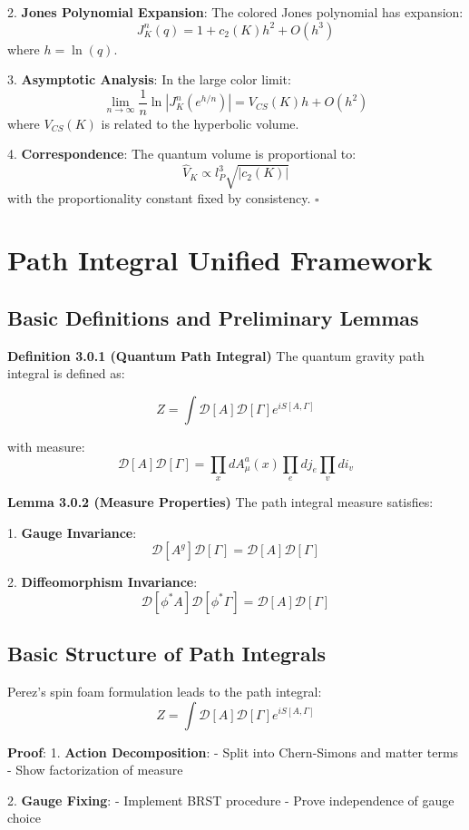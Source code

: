 \documentclass[12pt,a4paper]{article}
\begin{document}
2. \textbf{Jones Polynomial Expansion}:
   The colored Jones polynomial has expansion:
   \[
   J_K^n(q) = 1 + c_2(K)h^2 + O(h^3)
   \]
   where $h = \ln(q)$.

3. \textbf{Asymptotic Analysis}:
   In the large color limit:
   \[
   \lim_{n\to\infty} \frac{1}{n}\ln|J_K^n(e^{h/n})| = V_{CS}(K)h + O(h^2)
   \]
   where $V_{CS}(K)$ is related to the hyperbolic volume.

4. \textbf{Correspondence}:
   The quantum volume is proportional to:
   \[
   \hat{V}_K \propto l_P^3\sqrt{|c_2(K)|}
   \]
   with the proportionality constant fixed by consistency. $\square$

\section{Path Integral Unified Framework}
\subsection{Basic Definitions and Preliminary Lemmas}

\textbf{Definition 3.0.1 (Quantum Path Integral)}
The quantum gravity path integral is defined as:


\[
Z = \int \mathcal{D}[A]\mathcal{D}[\Gamma] e^{iS[A,\Gamma]}
\]

with measure:
\[
\mathcal{D}[A]\mathcal{D}[\Gamma] = \prod_x dA_\mu^a(x) \prod_e dj_e \prod_v di_v
\]

\textbf{Lemma 3.0.2 (Measure Properties)}
The path integral measure satisfies:

1. \textbf{Gauge Invariance}:
   \[
   \mathcal{D}[A^g]\mathcal{D}[\Gamma] = \mathcal{D}[A]\mathcal{D}[\Gamma]
   \]

2. \textbf{Diffeomorphism Invariance}:
   \[
   \mathcal{D}[\phi^*A]\mathcal{D}[\phi^*\Gamma] = \mathcal{D}[A]\mathcal{D}[\Gamma]
   \]

\subsection{Basic Structure of Path Integrals}
Perez's spin foam formulation\cite{perez2003spin} leads to the path integral:
\[
Z = \int \mathcal{D}[A]\mathcal{D}[\Gamma] e^{iS[A,\Gamma]}
\]

\textbf{Proof}:
1. \textbf{Action Decomposition}:
   - Split into Chern-Simons and matter terms
   - Show factorization of measure

2. \textbf{Gauge Fixing}:
   - Implement BRST procedure
   - Prove independence of gauge choice
\end{document}
